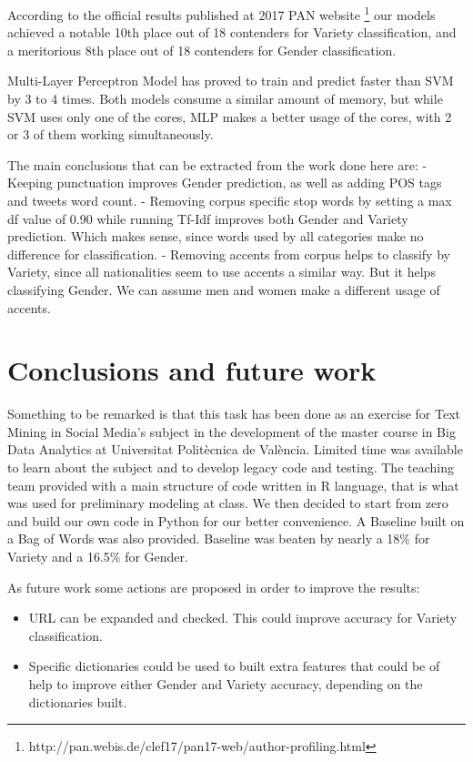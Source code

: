 \documentclass[11pt,a4paper]{article}
\begin{document}
According to the official results published at 2017 PAN website \footnote{http://pan.webis.de/clef17/pan17-web/author-profiling.html} our models achieved a notable 10th place out of 18 contenders for Variety classification, and a meritorious 8th place out of 18 contenders for Gender classification.

Multi-Layer Perceptron  Model has proved to train and predict faster than SVM by 3 to 4 times. Both models consume a similar amount of memory, but while SVM uses only one of the cores, MLP makes a better usage of the cores, with 2 or 3 of them working simultaneously.

The main conclusions that can be extracted from the work done here are:
    - Keeping punctuation improves Gender prediction, as well as adding POS tags and tweets word count.
    - Removing corpus specific stop words by setting a max df value of 0.90 while running Tf-Idf improves both Gender and Variety prediction. Which makes sense, since words used by all categories make no difference for classification.
    - Removing accents from corpus helps to classify by Variety, since all nationalities seem to use accents a similar way. But it helps classifying Gender. We can assume men and women make a different usage of accents.

\section{Conclusions and future work}

Something to be remarked is that this task has been done as an exercise for Text Mining in Social Media's subject in the development of the master course in Big Data Analytics at Universitat Polit\`ecnica de Val\`encia. Limited time was available to learn about the subject and to develop legacy code and testing. The teaching team provided with a main structure of code written in R language, that is what was used for preliminary modeling at class. We then decided to start from zero and build our own code in Python for our better convenience. A Baseline built on a Bag of Words was also provided. Baseline was beaten by nearly a 18\% for Variety and a 16.5\% for Gender.

As future work some actions are proposed in order to improve the results:
    \begin{itemize}
    \addtolength{\itemsep}{-1mm}
    \item URL can be expanded and checked. This could improve accuracy for Variety classification.
    \item Specific dictionaries could be used to built extra features that could be of help to improve either Gender and Variety accuracy, depending on the dictionaries built.
    \end{itemize}
        
\end{document}
